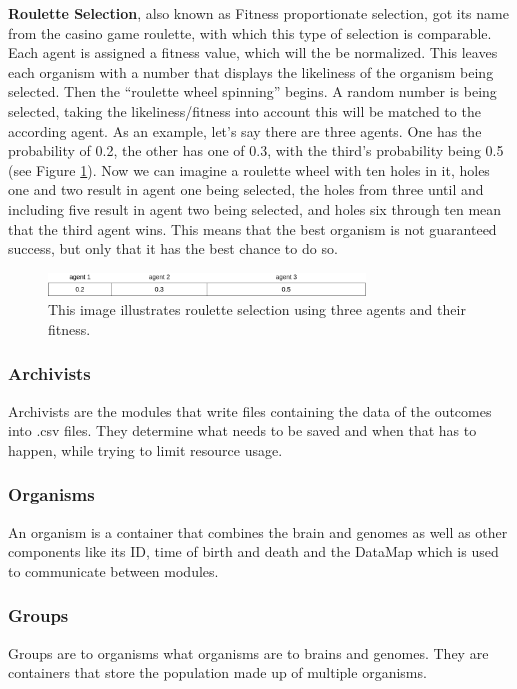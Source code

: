 \documentclass[12pt,oneside,listof=totoc,paper=a4,headings=small]{scrbook}
\begin{document}
\newpage
\textbf{Roulette Selection}, also known as Fitness proportionate selection, got its name from the casino game roulette, with which this type of selection is comparable. Each agent is assigned a fitness value, which will the be normalized. This leaves each organism with a number that displays the likeliness of the organism being selected. Then the ``roulette wheel spinning'' begins. A random number is being selected, taking the likeliness/fitness into account this will be matched to the according agent. As an example, let's say there are three agents. One has the probability of 0.2, the other has one of 0.3, with the third's probability being 0.5 (see Figure \ref{fig:roulette}). Now we can imagine a roulette wheel with ten holes in it, holes one and two result in agent one being selected, the holes from three until and including five result in agent two being selected, and holes six through ten mean that the third agent wins. This means that the best organism is not guaranteed success, but only that it has the best chance to do so.

\begin{figure}[h!]
\centering
\includegraphics[width=0.75\textwidth,height=0.75\textheight,keepaspectratio]{images/roulette.png}
\caption{This image illustrates roulette selection using three agents and their fitness.}
\label{fig:roulette}
\end{figure}


\subsubsection{Archivists}
Archivists are the modules that write files containing the data of the outcomes into .csv files. They determine what needs to be saved and when that has to happen, while trying to limit resource usage.

\subsubsection{Organisms}
An organism is a container that combines the brain and genomes as well as other components like its ID, time of birth and death and the DataMap which is used to communicate between modules.


\subsubsection{Groups}
Groups are to organisms what organisms are to brains and genomes. They are containers that store the population made up of multiple organisms.
\end{document}
